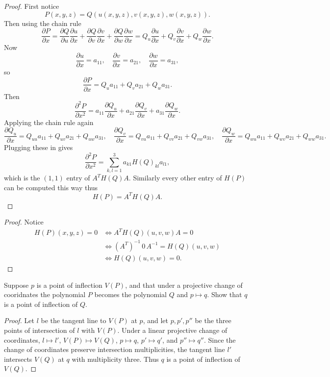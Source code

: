 \begin{proof}
    First notice 
    \[
    P(x, y, z) = Q(u(x, y, z), v(x, y, z), w(x, y, z)).
    \]
    Then using the chain rule
    \[
    \frac{\partial P}{\partial x} = \frac{\partial Q}{\partial u} \frac{\partial u}{\partial x} 
        + \frac{\partial Q}{\partial v} \frac{\partial v}{\partial x} 
        + \frac{\partial Q}{\partial w} \frac{\partial w}{\partial x}
        = Q_u \frac{\partial u}{\partial x} + Q_v \frac{\partial v}{\partial x} + Q_w \frac{\partial w}{\partial x}.
    \] 
    Now 
    \[
    \frac{\partial u}{\partial x} = a_{11}, \quad \frac{\partial v}{\partial x} = a_{21}, \quad \frac{\partial w}{\partial x} = a_{31},
    \]
    so
    \[
    \frac{\partial P}{\partial x} = Q_u a_{11} + Q_v a_{21} + Q_w a_{31}.
    \]
    Then
    \[
    \frac{\partial^2 P}{\partial x^2} = a_{11} \frac{\partial Q_u}{\partial x} + a_{21} \frac{\partial Q_v}{\partial x} + a_{31} \frac{\partial Q_w}{\partial x}.
    \]
    Applying the chain rule again 
    \[
    \frac{\partial Q_u}{\partial x} = Q_{uu} a_{11} + Q_{uv} a_{21} + Q_{uw} a_{31}, \quad
    \frac{\partial Q_v}{\partial x} = Q_{vu} a_{11} + Q_{vv} a_{21} + Q_{vw} a_{31}, \quad
    \frac{\partial Q_w}{\partial x} = Q_{wu} a_{11} + Q_{wv} a_{21} + Q_{ww} a_{31}.
    \]
    Plugging these in gives
    \[
    \frac{\partial^2 P}{\partial x^2} = \sum_{k,l=1}^3 a_{k1} H(Q)_{kl} a_{l1},
    \]
    which is the \((1,1)\) entry of \(A^T H(Q) A\).
    Similarly every other entry of \(H(P)\) can be computed this way thus
    \[
    H(P) = A^T H(Q) A.
    \]
\end{proof}

\begin{proof}
Notice 
\begin{align*}
    H(P)(x, y, z) = 0 
    &\iff A^T H(Q)(u, v, w) A = 0 \\
    &\iff (A^T)^{-1} \, 0 \, A^{-1} = H(Q)(u, v, w) \\
    &\iff H(Q)(u, v, w) = 0.
\end{align*}
\end{proof}

\begin{tcolorbox}[title=Problem 30, breakable]
    Suppose $p$ is a point of inflection $V(P)$, and that 
    under a projective change of cooridnates the polynomial $P$
    becomes the polynomial $Q$ and $p \mapsto q$.
    Show that $q$ is a point of inflection of $Q$.
\end{tcolorbox}

\begin{proof}
    Let $l$ be the tangent line to $V(P)$ at $p$, and let $p, p', p''$ be the three points of intersection of $l$ with $V(P)$.
    Under a linear projective change of coordinates, $l \mapsto l'$, $V(P) \mapsto V(Q)$, $p \mapsto q$, $p' \mapsto q'$, and $p'' \mapsto q''$.  
    Since the change of coordinates preserve intersection multiplicities, the tangent line $l'$ intersects $V(Q)$ at $q$ with multiplicity three.  
    Thus $q$ is a point of inflection of $V(Q)$.
\end{proof}

